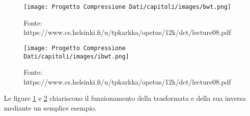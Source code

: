 \begin{enumerate}
\begin{figure}[h]
    \centering
    \texttt{[image: Progetto Compressione Dati/capitoli/images/bwt.png]}
\caption{Fonte: https://www.cs.helsinki.fi/u/tpkarkka/opetus/12k/dct/lecture08.pdf}
    \label{fig:bwt}
\end{figure}

\begin{figure}[h]
    \centering
    \texttt{[image: Progetto Compressione Dati/capitoli/images/ibwt.png]}
\caption{Fonte: https://www.cs.helsinki.fi/u/tpkarkka/opetus/12k/dct/lecture08.pdf}
    \label{fig:ibwt}
\end{figure}

Le figure \ref{fig:bwt} e \ref{fig:ibwt} chiariscono il funzionamento della trasformata e della sua inversa mediante un semplice esempio. 

\end{enumerate}
